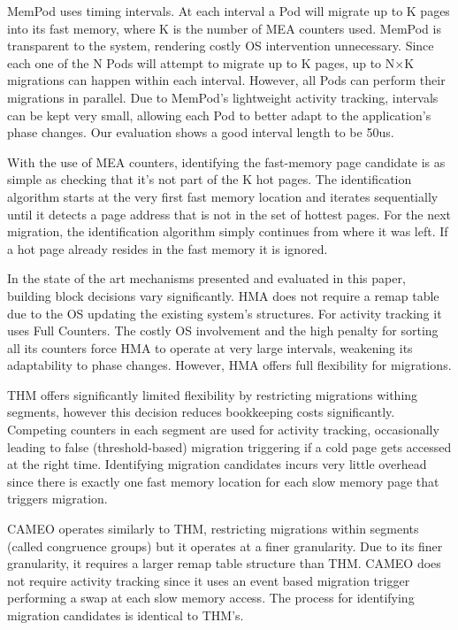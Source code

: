 MemPod uses timing intervals. At each interval a Pod will migrate up to K pages into its fast memory, where K is the number of MEA counters used. MemPod is transparent to the system, rendering costly OS intervention unnecessary. Since each one of the N Pods will attempt to migrate up to K pages, up to N$\times$K migrations can happen within each interval. However, all Pods can perform their migrations in parallel. Due to MemPod's lightweight activity tracking, intervals can be kept very small, allowing each Pod to better adapt to the application's phase changes. Our evaluation shows a good interval length to be 50us.

With the use of MEA counters, identifying the fast-memory page candidate is as simple as checking that it's not part of the K hot pages. The identification algorithm starts at the very first fast memory location and iterates sequentially until it detects a page address that is not in the set of hottest pages. For the next migration, the identification algorithm simply continues from where it was left. If a hot page already resides in the fast memory it is ignored.

In the state of the art mechanisms presented and evaluated in this paper, building block decisions vary significantly. HMA does not require a remap table due to the OS updating the existing system's structures. For activity tracking it uses Full Counters. The costly OS involvement and the high penalty for sorting all its counters force HMA to operate at very large intervals, weakening its adaptability to phase changes. However, HMA offers full flexibility for migrations.

THM offers significantly limited flexibility by restricting migrations withing segments, however this decision reduces bookkeeping costs significantly. Competing counters in each segment are used for activity tracking, occasionally leading to false (threshold-based) migration triggering if a cold page gets accessed at the right time. Identifying migration candidates incurs very little overhead since there is exactly one fast memory location for each slow memory page that triggers migration.

CAMEO operates similarly to THM, restricting migrations within segments (called congruence groups) but it operates at a finer granularity. Due to its finer granularity, it requires a larger remap table structure than THM. CAMEO does not require activity tracking since it uses an event based migration trigger performing a swap at each slow memory access. The process for identifying migration candidates is identical to THM's.

